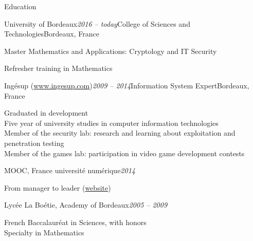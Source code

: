 \begin{rSection}{Education}

  \begin{rSubsection}{University of Bordeaux}{\em 2016 -- today}{College of Sciences and Technologies}{Bordeaux, France}
    \item Master Mathematics and Applications: Cryptology and IT Security
    \item Refresher training in Mathematics
  \end{rSubsection}

  \begin{rSubsection}{Ingésup (\href{www.ingesup.com}{www.ingesup.com})}{\em 2009 -- 2014}{Information System Expert}{Bordeaux, France}
    \item[] Graduated in development \\
    Five year of university studies in computer information technologies \\
    Member of the security lab: research and learning about exploitation and penetration testing \\
    Member of the games lab: participation in video game development contests
  \end{rSubsection}

  \begin{rSubsection}{MOOC, France université numérique}{\em 2014}{}{}
    \item[] From manager to leader (\href{https://www.france-universite-numerique-mooc.fr/courses/CNAM/01002/Trimestre_1_2014/about}{website})
  \end{rSubsection}

  \begin{rSubsection}{Lycée La Boétie, Academy of Bordeaux}{\em 2005 -- 2009}{}{}
    \item[] French Baccalauréat in Sciences, with honors \\
    Specialty in Mathematics
  \end{rSubsection}

\end{rSection}
